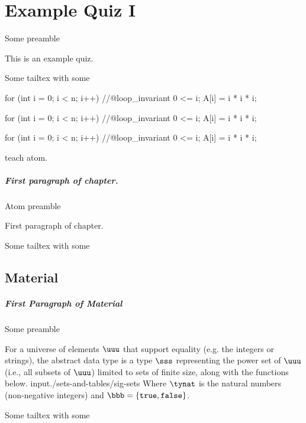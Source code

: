 \chapter[100]{Example Quiz I}
\label{ch:quiz-ii}

Some preamble \somecommand

\begin{preamble}
This is an example quiz.
\end{preamble}
Some tailtex with some \command

\begin{code}
  for (int i = 0; i < n; i++)  
  //@loop_invariant 0 <= i;  
  {  
    A[i] = i * i * i;  
  }  
\end{code}

\begin{code}[language=cnot, firstline = 100, lastline = 1000]
  for (int i = 0; i < n; i++)  
  //@loop_invariant 0 <= i;  
  {  
    A[i] = i * i * i;  
  }  
\end{code}


\begin{code}[title = some cnut code, language=cnot, firstline = 100, lastline = 1000]
  for (int i = 0; i < n; i++)  
  //@loop_invariant 0 <= i;  
  {  
    A[i] = i * i * i;  
  }  
\end{code}

\begin{teachask}
teach atom.
\end{teachask}

\paragraph{First paragraph of chapter.}

Atom preamble
\begin{gram}
First paragraph of chapter.
\end{gram}
Some tailtex with some \command
\newpage

\section{Material}

\paragraph{First Paragraph of Material}

Some preamble \somecommand
\begin{cluster}
\begin{datatype}[Sets]
\label{XXadt:sets} 
For a universe of elements $\uuu$ that support equality (e.g. the integers or strings), the 
 abstract data type is a type $\sss$ representing the power 
set of $\uuu$ (i.e., all subsets of $\uuu$) limited to sets of finite 
size, along with the functions below. 
{\normalsize
input{./sets-and-tables/sig-sets}
}
Where $\tynat$ is 
the natural numbers (non-negative integers) and $\bbb = \{\texttt{true},
\texttt{false}\}$.
\end{datatype}
Some tailtex with some \command
\end{cluster}

